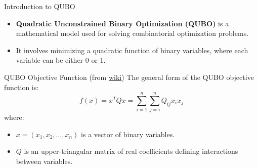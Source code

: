 \documentclass{beamer}
\begin{document}
	\begin{frame}{Introduction to QUBO}
		\begin{itemize}
			\item \textbf{Quadratic Unconstrained Binary Optimization (QUBO)} is a mathematical model used for solving combinatorial optimization problems.
			\item It involves minimizing a quadratic function of binary variables, where each variable can be either 0 or 1.
		\end{itemize}
	\end{frame}
	
	\begin{frame}{QUBO Objective Function (from \href{https://en.wikipedia.org/wiki/Quadratic_unconstrained_binary_optimization}{wiki})}
		The general form of the QUBO objective function is:
		\[
		f(x) = x^{T} Q x = \sum_{i=1}^n \sum_{j=i}^n Q_{ij} x_i x_j
		\]
		where:
		\begin{itemize}
			\item \( x = (x_1, x_2, \ldots, x_n) \) is a vector of binary variables.
			\item \( Q \) is an upper-triangular matrix of real coefficients defining interactions between variables.
		\end{itemize}
	\end{frame}
	
\end{document}
